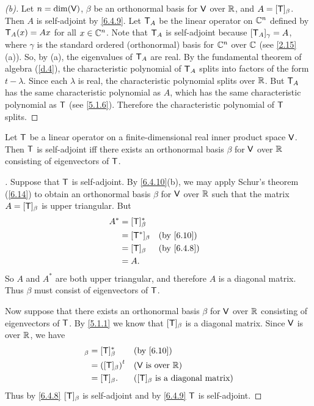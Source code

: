 \begin{proof}[(b)]
  Let \(n = \dim(\mathsf{V})\), \(\beta\) be an orthonormal basis for \(\mathsf{V}\) over \(\mathbb{R}\), and \(A = [\mathsf{T}]_{\beta}\).
  Then \(A\) is self-adjoint by \cref{6.4.9}.
  Let \(\mathsf{T}_A\) be the linear operator on \(\mathbb{C}^n\) defined by \(\mathsf{T}_A(x) = Ax\) for all \(x \in \mathbb{C}^n\).
  Note that \(\mathsf{T}_A\) is self-adjoint because \([\mathsf{T}_A]_{\gamma} = A\), where \(\gamma\) is the standard ordered (orthonormal) basis for \(\mathbb{C}^n\) over \(\mathbb{C}\) (see \cref{2.15}(a)).
  So, by (a), the eigenvalues of \(\mathsf{T}_A\) are real.
  By the fundamental theorem of algebra (\cref{d.4}), the characteristic polynomial of \(\mathsf{T}_A\) splits into factors of the form \(t - \lambda\).
  Since each \(\lambda\) is real, the characteristic polynomial splits over \(\mathbb{R}\).
  But \(\mathsf{T}_A\) has the same characteristic polynomial as \(A\), which has the same characteristic polynomial as \(\mathsf{T}\) (see \cref{5.1.6}).
  Therefore the characteristic polynomial of \(\mathsf{T}\) splits.
\end{proof}

\begin{thm}\label{6.17}
  Let \(\mathsf{T}\) be a linear operator on a finite-dimensional real inner product space \(\mathsf{V}\).
  Then \(\mathsf{T}\) is self-adjoint iff there exists an orthonormal basis \(\beta\) for \(\mathsf{V}\) over \(\mathbb{R}\) consisting of eigenvectors of \(\mathsf{T}\).
\end{thm}

\begin{proof}[]
  Suppose that \(\mathsf{T}\) is self-adjoint.
  By \cref{6.4.10}(b), we may apply Schur's theorem (\cref{6.14}) to obtain an orthonormal basis \(\beta\) for \(\mathsf{V}\) over \(\mathbb{R}\) such that the matrix \(A = [\mathsf{T}]_{\beta}\) is upper triangular.
  But
  \begin{align*}
    A^* & = [\T]_{\beta}^*                               \\
        & = [\T^*]_{\beta} &  & \text{(by \cref{6.10})}  \\
        & = [\T]_{\beta}   &  & \text{(by \cref{6.4.8})} \\
        & = A.
  \end{align*}
  So \(A\) and \(A^*\) are both upper triangular, and therefore \(A\) is a diagonal matrix.
  Thus \(\beta\) must consist of eigenvectors of \(\mathsf{T}\).

  Now suppose that there exists an orthonormal basis \(\beta\) for \(\mathsf{V}\) over \(\mathbb{R}\) consisting of eigenvectors of \(\mathsf{T}\).
  By \cref{5.1.1} we know that \([\mathsf{T}]_{\beta}\) is a diagonal matrix.
  Since \(\mathsf{V}\) is over \(\mathbb{R}\), we have
  \begin{align*}
    [\T^*]_{\beta} & = [\T]_{\beta}^*      &  & \text{(by \cref{6.10})}                        \\
                   & = \tp{([\T]_{\beta})} &  & \text{(\(\V\) is over \(\R\))}                 \\
                   & = [\T]_{\beta}.       &  & \text{(\([\T]_{\beta}\) is a diagonal matrix)}
  \end{align*}
  Thus by \cref{6.4.8} \([\mathsf{T}]_{\beta}\) is self-adjoint and by \cref{6.4.9} \(\mathsf{T}\) is self-adjoint.
\end{proof}

